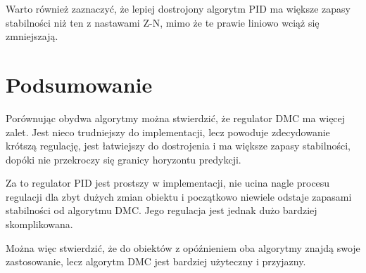 \documentclass[fleqn]{article}
\begin{document}
Warto również zaznaczyć, że lepiej dostrojony algorytm PID ma większe zapasy stabilności niż ten z nastawami Z-N, mimo że te prawie liniowo wciąż się zmniejszają.

\section{Podsumowanie}

Porównując obydwa algorytmy można stwierdzić, że regulator DMC ma więcej zalet. Jest nieco trudniejszy do implementacji, lecz powoduje zdecydowanie krótszą regulację, jest łatwiejszy do dostrojenia i ma większe zapasy stabilności, dopóki nie przekroczy się granicy horyzontu predykcji.

Za to regulator PID jest prostszy w implementacji, nie ucina nagle procesu regulacji dla zbyt dużych zmian obiektu i początkowo niewiele odstaje zapasami stabilności od algorytmu DMC. Jego regulacja jest jednak dużo bardziej skomplikowana.

Można więc stwierdzić, że do obiektów z opóźnieniem oba algorytmy znajdą swoje zastosowanie, lecz algorytm DMC jest bardziej użyteczny i przyjazny.
\end{document}
